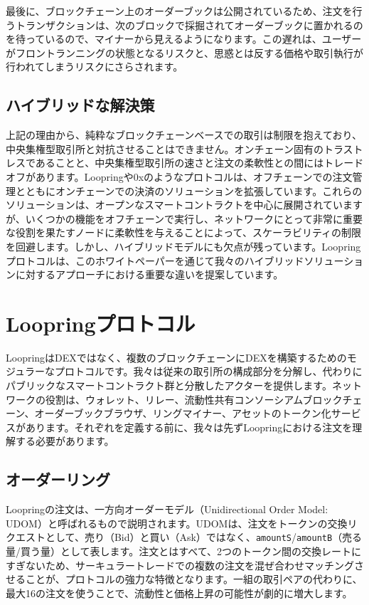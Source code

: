 \documentclass{article}
\begin{document}
\begin{multicols}{2}
最後に、ブロックチェーン上のオーダーブックは公開されているため、注文を行うトランザクションは、次のブロックで採掘されてオーダーブックに置かれるのを待っているので、マイナーから見えるようになります。この遅れは、ユーザーがフロントランニングの状態となるリスクと、思惑とは反する価格や取引執行が行われてしまうリスクにさらされます。

\subsection{ハイブリッドな解決策}
上記の理由から、純粋なブロックチェーンベースでの取引は制限を抱えており、中央集権型取引所と対抗させることはできません。オンチェーン固有のトラストレスであることと、中央集権型取引所の速さと注文の柔軟性との間にはトレードオフがあります。Loopringや0x\cite{warren20170x}のようなプロトコルは、オフチェーンでの注文管理とともにオンチェーンでの決済のソリューションを拡張しています。これらのソリューションは、オープンなスマートコントラクトを中心に展開されていますが、いくつかの機能をオフチェーンで実行し、ネットワークにとって非常に重要な役割を果たすノードに柔軟性を与えることによって、スケーラビリティの制限を回避します。しかし、ハイブリッドモデルにも欠点が残っています\cite{costofdecent}。Loopringプロトコルは、このホワイトペーパーを通じて我々のハイブリッドソリューションに対するアプローチにおける重要な違いを提案しています。

\section{Loopringプロトコル\label{sec:loopring_protocol}}
LoopringはDEXではなく、複数のブロックチェーンにDEXを構築するためのモジュラーなプロトコルです。我々は従来の取引所の構成部分を分解し、代わりにパブリックなスマートコントラクト群と分散したアクターを提供します。ネットワークの役割は、ウォレット、リレー、流動性共有コンソーシアムブロックチェーン、オーダーブックブラウザ、リングマイナー、アセットのトークン化サービスがあります。それぞれを定義する前に、我々は先ずLoopringにおける注文を理解する必要があります。

\subsection{オーダーリング\label{sec:order_ring}}
Loopringの注文は、一方向オーダーモデル（Unidirectional Order Model: UDOM）\cite{coinport2014udom}と呼ばれるもので説明されます。UDOMは、注文をトークンの交換リクエストとして、売り（Bid）と買い（Ask）ではなく、\verb|amountS|/\verb|amountB|（売る量/買う量）として表します。注文とはすべて、2つのトークン間の交換レートにすぎないため、サーキュラートレードでの複数の注文を混ぜ合わせマッチングさせることが、プロトコルの強力な特徴となります。一組の取引ペアの代わりに、最大16の注文を使うことで、流動性と価格上昇の可能性が劇的に増大します。


\end{multicols}
\end{document}
